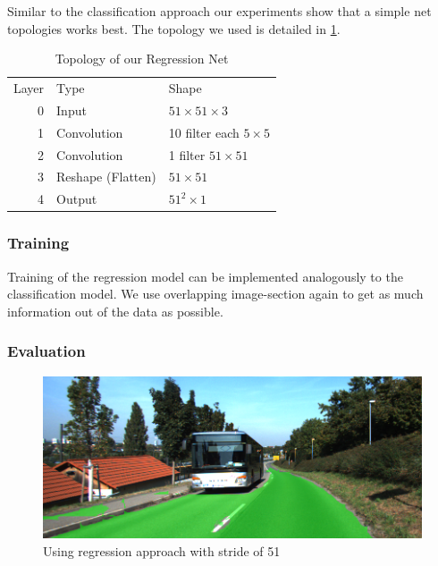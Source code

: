 Similar to the classification approach our experiments show that a simple net topologies works best. The topology we used is detailed in \cref{tab:topo2}.

\begin{table}[H]
	\normalsize
	\centering
	\begin{tabular}{r l l}
		Layer & Type  & Shape  \\
		0     & Input &  $51 \times 51 \times 3$ \\
		1     & Convolution & 10 filter  each $5 \times 5$ \\
		2     & Convolution & 1 filter $51 \times 51$  \\
		3     & Reshape (Flatten) & $51 \times 51$ \\
		4     & Output     & $51^2 \times 1$ \\
	\end{tabular}
	\caption{Topology of our Regression Net}
	\label{tab:topo2}
\end{table} 

\subsubsection{Training}

Training of the regression model can be implemented analogously to the classification model. We use overlapping image-section again to get as much information out of the data as possible.

\subsubsection{Evaluation}

\begin{figure}[]
	\centering
	\includegraphics[width=\columnwidth]{figures/models/testing2-um_32_conv_stride51.png}
	\caption{Using regression approach with stride of 51}
	\label{fig:reg_stride2}
\end{figure} 




